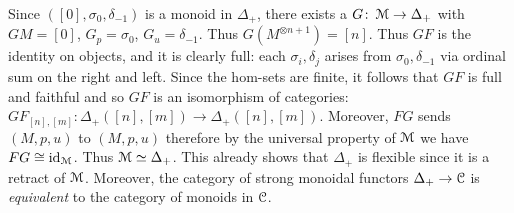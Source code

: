 \documentclass[a4paper,11pt,oneside,openany]{scrbook}
\begin{document}
\begin{exmp}
Since $([0],\sigma_0,\delta_{-1})$ is a monoid in $\Delta_+$, there exists a $G\colon \operatorname{\mathcal{M}}\to\Delta_+$ with $GM=[0]$, $G_p=\sigma_0$, $G_u=\delta_{-1}$. Thus $G(M^{\otimes n+1})=[n]$. Thus $GF$ is the identity on objects, and it is clearly full: each $\sigma_i,\delta_j$ arises from $\sigma_0, \delta_{-1}$ via ordinal sum on the right and left. Since the hom-sets are finite, it follows that $GF$ is full and faithful and so $GF$ is an isomorphism of categories: $GF_{[n],[m]}\colon\Delta_+([n],[m])\to\Delta_+([n],[m])$. Moreover, $FG$ sends $(M,p,u)$ to $(M,p,u)$ therefore by the universal property of $\operatorname{\mathcal{M}}$ we have $FG\cong \operatorname{id}_{\operatorname{\mathcal{M}}}$. Thus $\operatorname{\mathcal{M}}\simeq\Delta_+$. This already shows that $\Delta_+$ is flexible since it is a retract of $\operatorname{\mathcal{M}}$. Moreover, the category of strong monoidal functors $\Delta_+\to\operatorname{\mathcal{C}}$ is \emph{equivalent} to the category of monoids in $\operatorname{\mathcal{C}}$.    
\end{exmp}

\backmatter
\end{document}
